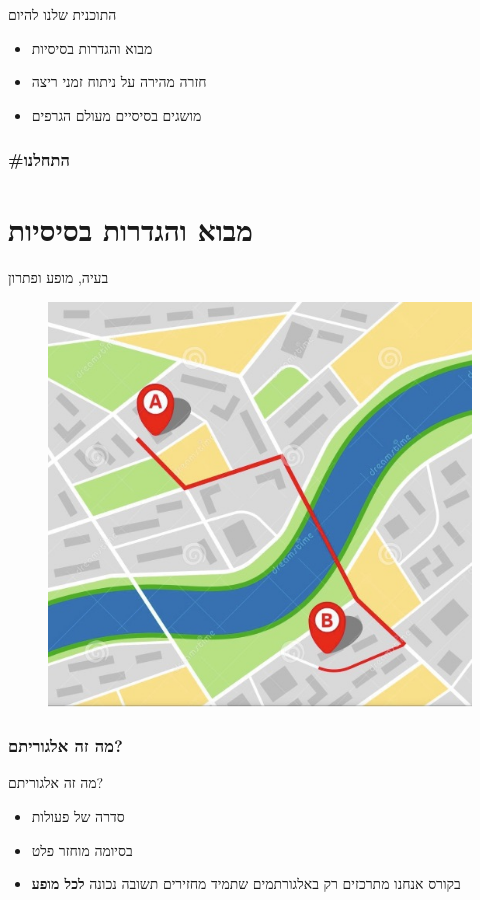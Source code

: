 \documentclass[luatex]{beamer}
\begin{document}
\begin{frame}{התוכנית שלנו להיום}
\pause
\begin{itemize}[<+->]
	\item מבוא והגדרות בסיסיות 
	\item חזרה מהירה על ניתוח זמני ריצה
	\item מושגים בסיסיים מעולם הגרפים
\end{itemize}
\end{frame}
\section{\#התחלנו}
\part{מבוא והגדרות בסיסיות}
\frame{\partpage}
\begin{frame}{בעיה, מופע ופתרון}
\begin{figure}
	\centering
	\includegraphics[width=0.7\linewidth]{imgs/screenshot001.jpg}
\end{figure}

\end{frame}
 \section{מה זה אלגוריתם?}
\begin{frame}{מה זה אלגוריתם?}



\pause
\begin{itemize}[<+->]
	\item סדרה של פעולות
	\item בסיומה מוחזר פלט
	\item בקורס אנחנו מתרכזים רק באלגורתמים שתמיד מחזירים תשובה נכונה \textbf{לכל מופע}
\end{itemize}
\end{frame}
\end{document}
